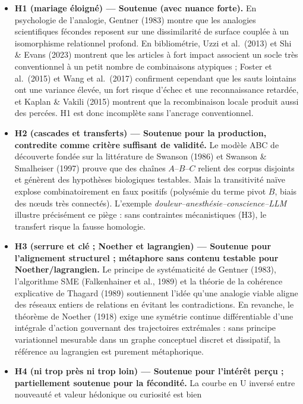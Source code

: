 \documentclass[a4paper,11pt]{article}
\providecommand{\tightlist}{\setlength{\itemsep}{0pt}\setlength{\parskip}{0pt}}
\begin{document}
\begin{itemize}
\tightlist
\item
  \textbf{H1 (mariage éloigné) --- Soutenue (avec nuance forte).} En
  psychologie de l'analogie, Gentner (1983) montre que les analogies
  scientifiques fécondes reposent sur une dissimilarité de surface
  couplée à un isomorphisme relationnel profond. En bibliométrie, Uzzi
  et al.~(2013) et Shi \& Evans (2023) montrent que les articles à fort
  impact associent un socle très conventionnel à un petit nombre de
  combinaisons atypiques ; Foster et al.~(2015) et Wang et al.~(2017)
  confirment cependant que les sauts lointains ont une variance élevée,
  un fort risque d'échec et une reconnaissance retardée, et Kaplan \&
  Vakili (2015) montrent que la recombinaison locale produit aussi des
  percées. H1 est donc incomplète sans l'ancrage conventionnel.
\item
  \textbf{H2 (cascades et transferts) --- Soutenue pour la production,
  contredite comme critère suffisant de validité.} Le modèle ABC de
  découverte fondée sur la littérature de Swanson (1986) et Swanson \&
  Smalheiser (1997) prouve que des chaînes \(A\text{–}B\text{–}C\)
  relient des corpus disjoints et génèrent des hypothèses biologiques
  testables. Mais la transitivité naïve explose combinatoirement en faux
  positifs (polysémie du terme pivot \(B\), biais des nœuds très
  connectés). L'exemple \emph{douleur--anesthésie--conscience--LLM}
  illustre précisément ce piège : sans contraintes mécanistiques (H3),
  le transfert risque la fausse homologie.
\item
  \textbf{H3 (serrure et clé ; Noether et lagrangien) --- Soutenue pour
  l'alignement structurel ; métaphore sans contenu testable pour
  Noether/lagrangien.} Le principe de systématicité de Gentner (1983),
  l'algorithme SME (Falkenhainer et al., 1989) et la théorie de la
  cohérence explicative de Thagard (1989) soutiennent l'idée qu'une
  analogie viable aligne des réseaux entiers de relations en évitant les
  contradictions. En revanche, le théorème de Noether (1918) exige une
  symétrie continue différentiable d'une intégrale d'action gouvernant
  des trajectoires extrémales : sans principe variationnel mesurable
  dans un graphe conceptuel discret et dissipatif, la référence au
  lagrangien est purement métaphorique.
\item
  \textbf{H4 (ni trop près ni trop loin) --- Soutenue pour l'intérêt
  perçu ; partiellement soutenue pour la fécondité.} La courbe en U
  inversé entre nouveauté et valeur hédonique ou curiosité est bien

\end{itemize}
\end{document}
